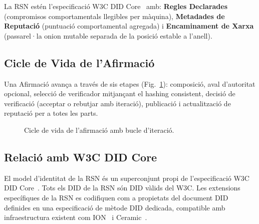 \documentclass[11pt,a4paper,twocolumn]{article}
\begin{document}
La RSN estén l'especificació W3C DID Core~\cite{did2022} amb: \textbf{Regles Declarades} (compromisos comportamentals llegibles per màquina), \textbf{Metadades de Reputació} (puntuació comportamental agregada) i \textbf{Encaminament de Xarxa} (passarel·la onion mutable separada de la posició estable a l'anell).

\subsection{Cicle de Vida de l'Afirmació}

Una Afirmació avança a través de sis etapes (Fig.~\ref{fig:lifecycle}): composició, aval d'autoritat opcional, selecció de verificador mitjançant el hashing consistent, decisió de verificació (acceptar o rebutjar amb iteració), publicació i actualització de reputació per a totes les parts.

\begin{figure}[ht]
\centering
{}
\caption{Cicle de vida de l'afirmació amb bucle d'iteració.}
\label{fig:lifecycle}
\end{figure}

\subsection{Relació amb W3C DID Core}

El model d'identitat de la RSN és un superconjunt propi de l'especificació W3C DID Core~\cite{did2022}. Tots els DID de la RSN són DID vàlids del W3C. Les extensions específiques de la RSN es codifiquen com a propietats del document DID definides en una especificació de mètode DID dedicada, compatible amb infraestructura existent com ION~\cite{buchner2021} i Ceramic~\cite{ceramic2023}.
\end{document}
